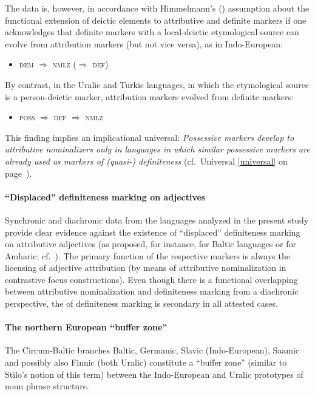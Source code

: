 The data is, however, in accordance with Himmelmann's (\citeyear[220–221]{himmelmann1997}) assumption about the functional extension of deictic elements to attributive and definite markers if one acknowledges that definite markers with a local-deictic etymological source can evolve from attribution markers (but not vice versa), as in Indo-European:
\begin{itemize}
\item \textsc{dem $\Rightarrow$ nmlz ($\Rightarrow$ def)}
\end{itemize}

By contrast, in the Uralic and Turkic languages, in which the etymological source is a person-deictic marker, attribution markers evolved from definite markers:
\begin{itemize}
\item \textsc{poss $\Rightarrow$ def $\Rightarrow$ nmlz}
\end{itemize}

This finding implies an implicational universal: \textit{Possessive markers develop to attributive nominalizers only in languages in which similar possessive markers are already used as markers of (quasi-) definiteness} (cf.~Universal \ref{universal} on page~\pageref{universal}).

\paragraph*{“Displaced” definiteness marking on adjectives}
Synchronic and diachronic data from the languages analyzed in the present study provide clear evidence against the existence of “displaced” definiteness marking on attributive adjectives (as proposed, for instance, for Baltic languages or for Amharic; cf.~\citealt[122]{dahl2015a}). The primary function of the respective markers is always the licensing of adjective attribution (by means of attributive nominalization in contrastive focus constructions). Even though there is a functional overlapping between attributive nominalization and definiteness marking from a diachronic perspective, the  of definiteness marking is secondary in all attested cases.

\paragraph*{The northern European “buffer zone”}
The Circum-Baltic branches Baltic, Germanic, Slavic (Indo-European), Saamic and possibly also Finnic (both Uralic) constitute a “buffer zone” (similar to Stilo's \citeyear{stilo2005} notion of this term) between the Indo-European and Uralic prototypes of noun phrase structure.

